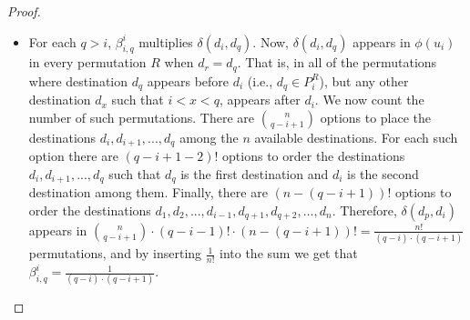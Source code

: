 \documentclass[sigconf]{aamas}
\begin{document}
\begin{proof}
\begin{itemize}

\item For each $q>i$, $\beta_{i,q}^i$ multiplies $\delta(d_i,d_q)$. Now, 
$\delta(d_i,d_q)$ appears in $\phi(u_i)$ in every permutation $R$ when $d_r=d_q$. That is, in all of the permutations where destination $d_q$ appears before $d_i$ (i.e., $d_q \in P^R_i$), but any other destination $d_x$ such that $i<x<q$, appears after $d_i$. We now count the number of such permutations. There are $\binom{n}{q-i+1}$ options to place the destinations $d_i,d_{i+1},...,d_q$ among the $n$ available destinations. For each such option there are $(q-i+1-2)!$ options to order the destinations $d_i,d_{i+1},...,d_q$ such that $d_q$ is the first destination and $d_i$ is the second destination among them. Finally, there are $(n-(q-i+1))!$ options to order the destinations $d_1, d_2,...,d_{i-1},d_{q+1},d_{q+2},...,d_n$. Therefore, $\delta(d_p,d_i)$ appears in $\binom{n}{q-i+1} \cdot (q-i-1)! \cdot (n-(q-i+1))! = \frac{n!}{(q-i)\cdot (q-i+1)}$ permutations, and by inserting $\frac{1}{n!}$ into the sum we get that $\beta_{i,q}^i = \frac{1}{(q-i)\cdot (q-i+1)}$.



\end{itemize}
\end{proof}
\end{document}
